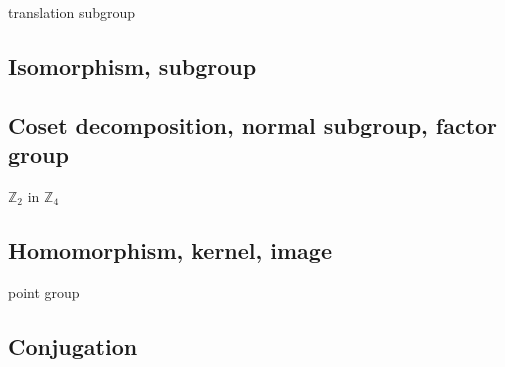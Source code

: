 translation subgroup

\subsection{Isomorphism, subgroup}



\subsection{Coset decomposition, normal subgroup, factor group}


$\mathbb{Z}_{2}$ in $\mathbb{Z}_{4}$

\subsection{Homomorphism, kernel, image}

point group

\subsection{Conjugation}
